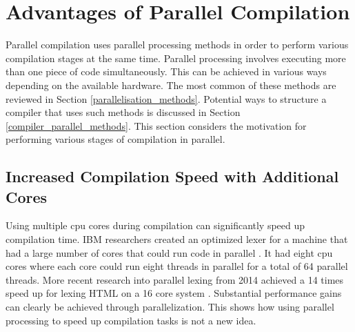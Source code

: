 \section{Advantages of Parallel Compilation} \label{advantages_parallel_compilation}

Parallel compilation uses parallel processing methods in order to perform
various compilation stages at the same time. Parallel processing involves
executing more than one piece of code simultaneously. This can be achieved in
various ways depending on the available hardware. The most common of these
methods are reviewed in Section \ref{parallelisation_methods}. Potential ways
to structure a compiler that uses such methods is discussed in Section
\ref{compiler_parallel_methods}. This section considers the motivation for
performing various stages of compilation in parallel.

\subsection{Increased Compilation Speed with Additional Cores}

Using multiple \gls{cpu} cores during compilation can significantly speed
up compilation time. IBM researchers created an optimized lexer for a
machine that had a large number of cores that could run code in parallel
\citep{scarpazza_high-performance_2009}. It had eight \gls{cpu} cores where each
core could run eight threads in parallel for a total of 64 parallel threads.
More recent research into parallel lexing from 2014 achieved a 14 times speed
up for lexing HTML on a 16 core system \citep{mytkowicz_data-parallel_2014}.
Substantial performance gains can clearly be achieved through parallelization.
This shows how using parallel processing to speed up compilation tasks is not a
new idea.

